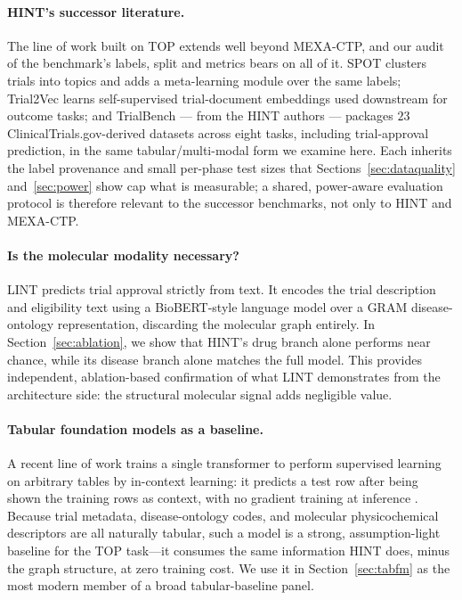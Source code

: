\documentclass[a4paper,fleqn]{cas-sc}
\begin{document}
\paragraph{HINT's successor literature.} The line of work built on TOP extends well beyond
MEXA-CTP, and our audit of the benchmark's labels, split and metrics bears on all of it. SPOT
\citep{wang2023spot} clusters trials into topics and adds a meta-learning module over the same
labels; Trial2Vec \citep{wang2022trial2vec} learns self-supervised trial-document embeddings
used downstream for outcome tasks; and TrialBench \citep{chen2025trialbench} --- from the HINT
authors --- packages $23$ ClinicalTrials.gov-derived datasets across eight tasks, including
trial-approval prediction, in the same tabular/multi-modal form we examine here. Each inherits
the label provenance and small per-phase test sizes that Sections~\ref{sec:dataquality}
and~\ref{sec:power} show cap what is measurable; a shared, power-aware evaluation protocol is
therefore relevant to the successor benchmarks, not only to HINT and MEXA-CTP.
\paragraph{Is the molecular modality necessary?} LINT \citep{gao2024lint} predicts trial approval strictly from text. It encodes the trial description and eligibility text using a BioBERT-style language model over a GRAM disease-ontology representation, discarding the molecular graph entirely. In Section~\ref{sec:ablation}, we show that HINT's drug branch alone performs near chance, while its disease branch alone matches the full model. This provides independent, ablation-based confirmation of what LINT demonstrates from the architecture side: the structural molecular signal adds negligible value.
\paragraph{Tabular foundation models as a baseline.} A recent line of work trains a single transformer to perform supervised learning on arbitrary tables by in-context learning: it predicts a test row after being shown the training rows as context, with no gradient training at inference \citep{hollmann2025tabpfn,google2026tabfm}. Because trial metadata, disease-ontology codes, and molecular physicochemical descriptors are all naturally tabular, such a model is a strong, assumption-light baseline for the TOP task---it consumes the same information HINT does, minus the graph structure, at zero training cost. We use it in Section~\ref{sec:tabfm} as the most modern member of a broad tabular-baseline panel.
\end{document}
